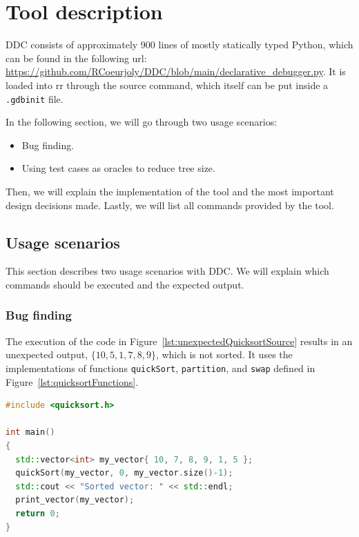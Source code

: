 \chapter{Tool description}
\label{cap:toolDescription}
DDC consists of approximately 900 lines of mostly statically typed Python, which can be found in the following url: \url{https://github.com/RCoeurjoly/DDC/blob/main/declarative_debugger.py}.
%
It is loaded into rr through the source command, which itself can be put inside a \verb|.gdbinit| file.

In the following section, we will go through two usage scenarios:
\begin{itemize}
    \item Bug finding.
    \item Using test cases as oracles to reduce tree size.
\end{itemize}

Then, we will explain the implementation of the tool and the most important design decisions made. 
%
Lastly, we will list all commands provided by the tool.

\section{Usage scenarios}
This section describes two usage scenarios with DDC.
We will explain which commands should be executed and the expected output.

\subsection{Bug finding}
The execution of the code in Figure~\ref{lst:unexpectedQuicksortSource} results in an unexpected output, \(\{10, 5, 1, 7, 8, 9\}\), which is not sorted.
It uses the implementations of functions \verb|quickSort|, \verb|partition|, and \verb|swap| defined in Figure~\ref{lst:quicksortFunctions}.
\begin{lstlisting}[language=C++, caption={Code that results in unexpected output}, frame=tb, label={lst:unexpectedQuicksortSource}]
#include <quicksort.h>

int main()
{
  std::vector<int> my_vector{ 10, 7, 8, 9, 1, 5 };
  quickSort(my_vector, 0, my_vector.size()-1);
  std::cout << "Sorted vector: " << std::endl;
  print_vector(my_vector);
  return 0;
}
\end{lstlisting}

